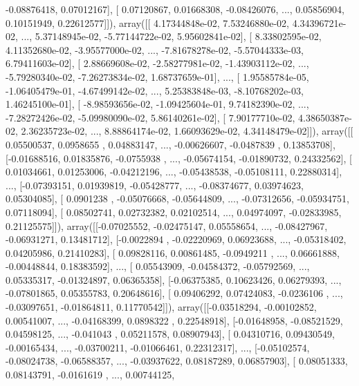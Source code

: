 \documentclass{article}
\begin{document}
        -0.08876418,  0.07012167],
       [ 0.07120867,  0.01668308, -0.08426076, ...,  0.05856904,
         0.10151949,  0.22612577]]), array([[  4.17344848e-02,   7.53246880e-02,   4.34396721e-02, ...,
          5.37148945e-02,  -5.77144722e-02,   5.95602841e-02],
       [  8.33802595e-02,   4.11352680e-02,  -3.95577000e-02, ...,
         -7.81678278e-02,  -5.57044333e-03,   6.79411603e-02],
       [  2.88669608e-02,  -2.58277981e-02,  -1.43903112e-02, ...,
         -5.79280340e-02,  -7.26273834e-02,   1.68737659e-01],
       ..., 
       [  1.95585784e-05,  -1.06405479e-01,  -4.67499142e-02, ...,
          5.25383848e-03,  -8.10768202e-03,   1.46245100e-01],
       [ -8.98593656e-02,  -1.09425604e-01,   9.74182390e-02, ...,
         -7.28272426e-02,  -5.09980090e-02,   5.86140261e-02],
       [  7.90177710e-02,   4.38650387e-02,   2.36235723e-02, ...,
          8.88864174e-02,   1.66093629e-02,   4.34148479e-02]]), array([[ 0.05500537,  0.0958655 ,  0.04883147, ..., -0.00626607,
        -0.0487839 ,  0.13853708],
       [-0.01688516,  0.01835876, -0.0755938 , ..., -0.05674154,
        -0.01890732,  0.24332562],
       [ 0.01034661,  0.01253006, -0.04212196, ..., -0.05438538,
        -0.05108111,  0.22880314],
       ..., 
       [-0.07393151,  0.01939819, -0.05428777, ..., -0.08374677,
         0.03974623,  0.05304085],
       [ 0.0901238 , -0.05076668, -0.05644809, ..., -0.07312656,
        -0.05934751,  0.07118094],
       [ 0.08502741,  0.02732382,  0.02102514, ...,  0.04974097,
        -0.02833985,  0.21125575]]), array([[-0.07025552, -0.02475147,  0.05558654, ..., -0.08427967,
        -0.06931271,  0.13481712],
       [-0.0022894 , -0.02220969,  0.06923688, ..., -0.05318402,
         0.04205986,  0.21410283],
       [ 0.09828116,  0.00861485, -0.0949211 , ...,  0.06661888,
        -0.00448844,  0.18383592],
       ..., 
       [ 0.05543909, -0.04584372, -0.05792569, ...,  0.05335317,
        -0.01324897,  0.06365358],
       [-0.06375385,  0.10623426,  0.06279393, ..., -0.07801865,
         0.05355783,  0.20648616],
       [ 0.09406292,  0.07424083, -0.0236106 , ..., -0.03097651,
        -0.01864811,  0.11770542]]), array([[-0.03518294, -0.00102852,  0.00541007, ..., -0.04168399,
         0.0898322 ,  0.22548918],
       [-0.01648958, -0.08521529,  0.04598125, ..., -0.041043  ,
         0.05211578,  0.08907943],
       [ 0.04310716,  0.09430549, -0.00165434, ..., -0.03700211,
        -0.01066461,  0.22312317],
       ..., 
       [-0.05102574, -0.08024738, -0.06588357, ..., -0.03937622,
         0.08187289,  0.06857903],
       [ 0.08051333,  0.08143791, -0.0161619 , ...,  0.00744125,
\end{document}
